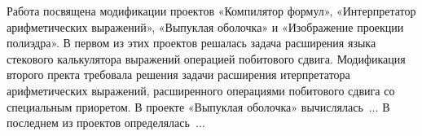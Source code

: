 Работа посвящена модификации проектов «Компилятор формул»,
«Интерпретатор арифметических выражений», «Выпуклая оболочка» и
«Изображение проекции полиэдра». В первом из этих проектов решалась
задача расширения языка стекового калькулятора выражений операцией побитового сдвига.
Модификация второго пректа требовала решения задачи расширения итерпретатора
арифметических выражений, расширенного операциями побитового сдвига со специальным
приоретом. В проекте «Выпуклая оболочка» вычислялась~$\ldots$ В последнем из проектов
определялась~$\ldots$

